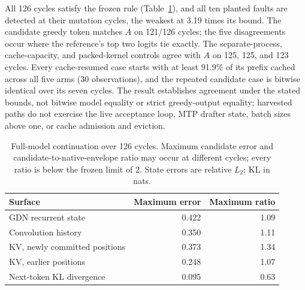All 126 cycles satisfy the frozen rule (Table~\ref{tab:fullmodel-agreement}), and all ten planted faults are detected at their mutation cycles, the weakest at 3.19 times its bound. The candidate greedy token matches $A$ on 121/126 cycles; the five disagreements occur where the reference's top two logits tie exactly. The separate-process, cache-capacity, and packed-kernel controls agree with $A$ on 125, 125, and 123 cycles. Every cache-resumed case starts with at least 91.9\% of its prefix cached across all five arms (30 observations), and the repeated candidate case is bitwise identical over its seven cycles. The result establishes agreement under the stated bounds, not bitwise model equality or strict greedy-output equality; harvested paths do not exercise the live acceptance loop, MTP drafter state, batch sizes above one, or cache admission and eviction.

\begin{table}[t]
\caption{Full-model continuation over 126 cycles. Maximum candidate error and candidate-to-native-envelope ratio may occur at different cycles; every ratio is below the frozen limit of 2. State errors are relative $L_2$; KL in nats.}
\label{tab:fullmodel-agreement}
\centering\small
\setlength{\tabcolsep}{4pt}
\begin{tabular}{@{}lrr@{}}
\toprule
Surface & Maximum error & Maximum ratio \\
\midrule
GDN recurrent state & 0.422 & 1.09 \\
Convolution history & 0.350 & 1.11 \\
KV, newly committed positions & 0.373 & 1.34 \\
KV, earlier positions & 0.248 & 1.07 \\
Next-token KL divergence & 0.095 & 0.63 \\
\bottomrule
\end{tabular}
\end{table}
